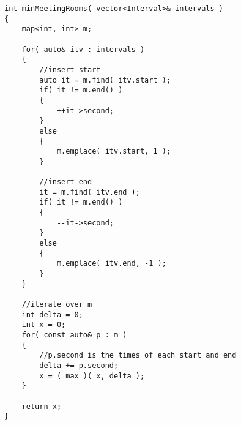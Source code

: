 \setcounter{lstlisting}{0}
\begin{lstlisting}[style=customc, caption={Tree Map}]
int minMeetingRooms( vector<Interval>& intervals )
{
    map<int, int> m;

    for( auto& itv : intervals )
    {
        //insert start
        auto it = m.find( itv.start );
        if( it != m.end() )
        {
            ++it->second;
        }
        else
        {
            m.emplace( itv.start, 1 );
        }

        //insert end
        it = m.find( itv.end );
        if( it != m.end() )
        {
            --it->second;
        }
        else
        {
            m.emplace( itv.end, -1 );
        }
    }

    //iterate over m
    int delta = 0;
    int x = 0;
    for( const auto& p : m )
    {
        //p.second is the times of each start and end
        delta += p.second;
        x = ( max )( x, delta );
    }

    return x;
}
\end{lstlisting}
